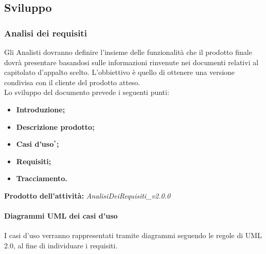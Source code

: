\documentclass[11pt,a4paper]{article}
\begin{document}
{%
	
	\subsection{Sviluppo}
	\subsubsection{Analisi dei requisiti}
	Gli Analisti dovranno definire l'insieme delle funzionalità che il prodotto finale dovrà presentare basandosi sulle informazioni rinvenute nei documenti relativi al capitolato d'appalto scelto. L'obbiettivo è quello di ottenere una versione condivisa con il cliente del prodotto atteso.\\
	Lo sviluppo del documento prevede i seguenti punti:	
	\begin{itemize}
		\item \textbf{Introduzione;}
		\item \textbf{Descrizione prodotto;}
		\item \textbf{Casi d'uso$^*$;}
		\item \textbf{Requisiti;}
		\item \textbf{Tracciamento.}
	\end{itemize}
	
	\textbf{Prodotto dell'attività:} \textit{AnalisiDeiRequisiti\_v2.0.0}
	
	\paragraph{Diagrammi UML dei casi d'uso\\}
	 I casi d'uso verranno rappresentati tramite diagrammi seguendo le regole di UML 2.0, al fine di individuare i requisiti.
}
\end{document}
